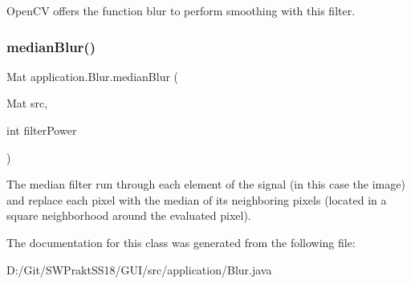Open\+CV offers the function blur to perform smoothing with this filter. \mbox{\label{classapplication_1_1_blur_a070e2c5803f62149b71ae9bc867a44da}} 
\subsubsection{\texorpdfstring{median\+Blur()}{medianBlur()}}
{\footnotesize\ttfamily Mat application.\+Blur.\+median\+Blur (\begin{DoxyParamCaption}\item[{Mat}]{src,  }\item[{int}]{filter\+Power }\end{DoxyParamCaption})}

The median filter run through each element of the signal (in this case the image) and replace each pixel with the median of its neighboring pixels (located in a square neighborhood around the evaluated pixel). 

The documentation for this class was generated from the following file\+:\begin{DoxyCompactItemize}
\item 
D\+:/\+Git/\+S\+W\+Prakt\+S\+S18/\+G\+U\+I/src/application/Blur.\+java\end{DoxyCompactItemize}
